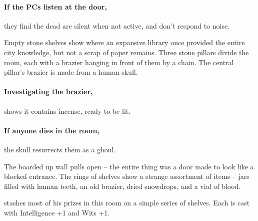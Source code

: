 \begin{multicols}{2}
\paragraph{If the PCs listen at the door,}
they find the dead are silent when not active, and don't respond to noise.

\ghast

\ghoul

\label{oldlibrary}

\begin{boxtext}

  Empty stone shelves show where an expansive library once provided the entire city knowledge, but not a scrap of paper remains.
  Three stone pillars divide the room, each with a brazier hanging in front of them by a chain.
  The central pillar's brazier is made from a human skull.

\end{boxtext}

\paragraph{Investigating the brazier,}
shows it contains incense, ready to be lit.

\paragraph{If anyone dies in the room,}
the skull resurrects them as a ghoul.



\begin{boxtext}

  The boarded up wall pulls open -- the entire thing was a door made to look like a blocked entrance.  The rings of shelves show a strange assortment of items -- jars filled with human teeth, an old brazier, dried snowdrops, and a vial of blood.

\end{boxtext}

 stashes most of his prizes in this room on a simple series of shelves.
Each is cast with Intelligence +1 and Wits +1.

\begin{enumerate}


\end{enumerate}
\end{multicols}
